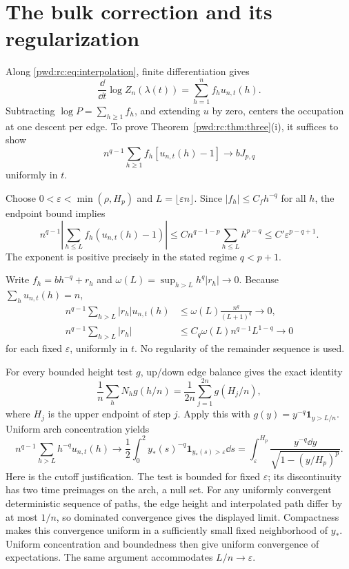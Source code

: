 \documentclass[11pt,letterpaper]{article}
\numberwithin{equation}{section}
\theoremstyle{remark}\newtheorem{remark}[theorem]{Remark}
\begin{document}
\section{The bulk correction and its regularization}\label{pwd:rc:sec:bulk}
Along \eqref{pwd:rc:eq:interpolation}, finite differentiation gives
\begin{equation}\label{pwd:rc:eq:derivative}
 \frac{\dd}{\dd t}\log Z_n(\lambda(t))=\sum_{h=1}^nf_hu_{n,t}(h).
\end{equation}
Subtracting $\log P=\sum_{h\ge1}f_h$, and extending $u$ by zero, centers the occupation at one descent per edge. To prove Theorem~\ref{pwd:rc:thm:three}(i), it suffices to show
\begin{equation}\label{pwd:rc:eq:bulk-target}
 n^{q-1}\sum_{h\ge1}f_h[u_{n,t}(h)-1]\longrightarrow bJ_{p,q}
\end{equation}
uniformly in $t$.

Choose $0<\varepsilon<\min(\rho,H_p)$ and $L=\lfloor\varepsilon n\rfloor$. Since $|f_h|\le C_fh^{-q}$ for all $h$, the endpoint bound implies
\begin{equation}\label{pwd:rc:eq:bulk-low}
 n^{q-1}\left|\sum_{h\le L}f_h(u_{n,t}(h)-1)\right|
 \le C n^{q-1-p}\sum_{h\le L}h^{p-q}
 \le C'\varepsilon^{p-q+1}.
\end{equation}
The exponent is positive precisely in the stated regime $q<p+1$.

Write $f_h=bh^{-q}+r_h$ and $\omega(L)=\sup_{h>L}h^q|r_h|\to0$. Because $\sum_hu_{n,t}(h)=n$,
\begin{align*}
 n^{q-1}\sum_{h>L}|r_h|u_{n,t}(h)&\le\omega(L)\frac{n^q}{(L+1)^q}\longrightarrow0,\\
 n^{q-1}\sum_{h>L}|r_h|&\le C_q\omega(L)n^{q-1}L^{1-q}\longrightarrow0
\end{align*}
for each fixed $\varepsilon$, uniformly in $t$. No regularity of the remainder sequence is used.

For every bounded height test $g$, up/down edge balance gives the exact identity
\begin{equation}\label{pwd:rc:eq:occupation-identity}
 \frac1n\sum_hN_hg(h/n)=\frac1{2n}\sum_{j=1}^{2n}g(H_j/n),
\end{equation}
where $H_j$ is the upper endpoint of step $j$. Apply this with $g(y)=y^{-q}\mathbf1_{y>L/n}$. Uniform arch concentration yields
\begin{equation}\label{pwd:rc:eq:cutoff-limit}
 n^{q-1}\sum_{h>L}h^{-q}u_{n,t}(h)
 \longrightarrow\frac12\int_0^2 y_*(s)^{-q}\mathbf1_{y_*(s)>\varepsilon}\dd s
 =\int_\varepsilon^{H_p}\frac{y^{-q}\dd y}{\sqrt{1-(y/H_p)^p}}.
\end{equation}
Here is the cutoff justification. The test is bounded for fixed $\varepsilon$; its discontinuity has two time preimages on the arch, a null set. For any uniformly convergent deterministic sequence of paths, the edge height and interpolated path differ by at most $1/n$, so dominated convergence gives the displayed limit. Compactness makes this convergence uniform in a sufficiently small fixed neighborhood of $y_*$. Uniform concentration and boundedness then give uniform convergence of expectations. The same argument accommodates $L/n\to\varepsilon$.
\end{document}
